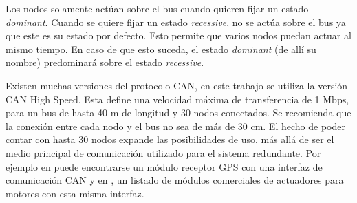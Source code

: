 Los nodos solamente actúan sobre el bus cuando quieren fijar un estado \textit{dominant}. Cuando se quiere fijar un estado \textit{recessive}, no se actúa sobre el bus ya que este es su estado por defecto. Esto permite que varios nodos puedan actuar al mismo tiempo. En caso de que esto suceda, el estado \textit{dominant} (de allí su nombre) predominará sobre el estado \textit{recessive}.

Existen muchas versiones del protocolo CAN, en este trabajo se utiliza la versión CAN High Speed. Esta define una velocidad máxima de transferencia de 1 Mbps, para un bus de hasta 40 m de longitud y 30 nodos conectados. Se recomienda que la conexión entre cada nodo y el bus no sea de más de 30 cm. El hecho de poder contar con hasta 30 nodos expande las posibilidades de uso, más allá de ser el medio principal de comunicación utilizado para el sistema redundante. Por ejemplo en \cite{GPS_CAN} puede encontrarse un módulo receptor GPS con una interfaz de comunicación CAN y en \cite{ardupilot_ESC_CAN}, un listado de módulos comerciales de actuadores para motores con esta misma interfaz. %






